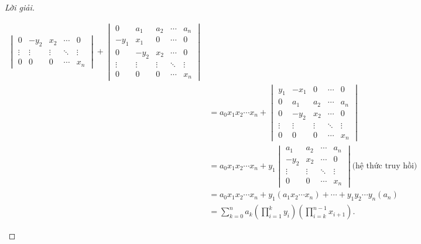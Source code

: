 \documentclass[class=nhvh-linear-algebra,crop=false]{standalone}
\begin{document}
\begin{proof}[Lời giải]
\begin{enumerate}[label = (\alph*)]
\begin{align*}
\begin{vmatrix}
                      0      & -y_{2} & x_{2}  & \cdots & 0      \\
                      \vdots & \vdots & \vdots & \ddots & \vdots \\
                      0      & 0      & 0      & \cdots & x_{n}
                  \end{vmatrix}
                  +
                  \begin{vmatrix}
                      0      & a_{1}  & a_{2}  & \cdots & a_{n}  \\
                      -y_{1} & x_{1}  & 0      & \cdots & 0      \\
                      0      & -y_{2} & x_{2}  & \cdots & 0      \\
                      \vdots & \vdots & \vdots & \ddots & \vdots \\
                      0      & 0      & 0      & \cdots & x_{n}
                  \end{vmatrix}                                                         \\
                   & =
                  a_{0}x_{1}x_{2}\cdots x_{n}
                  +
                  \begin{vmatrix}
                      y_{1}  & -x_{1} & 0      & \cdots & 0      \\
                      0      & a_{1}  & a_{2}  & \cdots & a_{n}  \\
                      0      & -y_{2} & x_{2}  & \cdots & 0      \\
                      \vdots & \vdots & \vdots & \ddots & \vdots \\
                      0      & 0      & 0      & \cdots & x_{n}
                  \end{vmatrix}                                                         \\
                   & =
                  a_{0}x_{1}x_{2}\cdots x_{n}
                  +
                  y_{1}
                  \begin{vmatrix}
                      a_{1}  & a_{2}  & \cdots & a_{n}  \\
                      -y_{2} & x_{2}  & \cdots & 0      \\
                      \vdots & \vdots & \ddots & \vdots \\
                      0      & 0      & \cdots & x_{n}
                  \end{vmatrix} \text{(hệ thức truy hồi)}                                                            \\
                   & = a_{0}x_{1}x_{2}\cdots x_{n}
                  + y_{1} (a_{1}x_{2}\cdots x_{n})
                  + \cdots
                  + y_{1}y_{2}\cdots y_{n} (a_{n})                                                                   \\
                   & = \sum^{n}_{k=0} a_{k}\left(\prod^{k}_{i=1}y_{i}\right)\left(\prod^{n-1}_{i=k}x_{i + 1}\right).
              \end{align*}
    \end{enumerate}
\end{proof}
\end{document}
